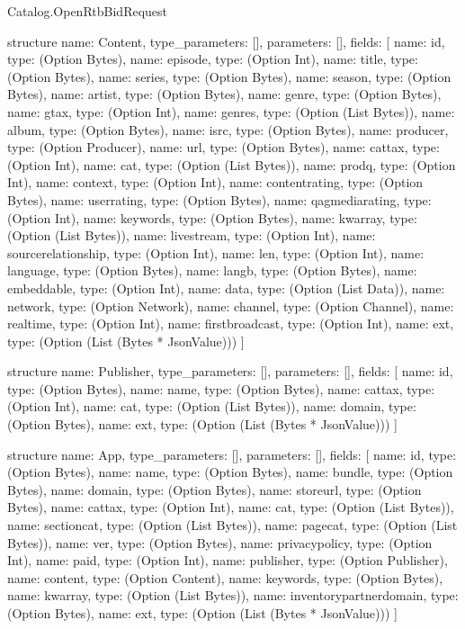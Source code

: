 \begin{lexlean}{Catalog.OpenRtbBidRequest}
\begin{semanticmodule}
structure{
  name: Content,
  type_parameters: [],
  parameters: [],
  fields: [
    {name: id, type: (Option Bytes)},
    {name: episode, type: (Option Int)},
    {name: title, type: (Option Bytes)},
    {name: series, type: (Option Bytes)},
    {name: season, type: (Option Bytes)},
    {name: artist, type: (Option Bytes)},
    {name: genre, type: (Option Bytes)},
    {name: gtax, type: (Option Int)},
    {name: genres, type: (Option (List Bytes))},
    {name: album, type: (Option Bytes)},
    {name: isrc, type: (Option Bytes)},
    {name: producer, type: (Option Producer)},
    {name: url, type: (Option Bytes)},
    {name: cattax, type: (Option Int)},
    {name: cat, type: (Option (List Bytes))},
    {name: prodq, type: (Option Int)},
    {name: context, type: (Option Int)},
    {name: contentrating, type: (Option Bytes)},
    {name: userrating, type: (Option Bytes)},
    {name: qagmediarating, type: (Option Int)},
    {name: keywords, type: (Option Bytes)},
    {name: kwarray, type: (Option (List Bytes))},
    {name: livestream, type: (Option Int)},
    {name: sourcerelationship, type: (Option Int)},
    {name: len, type: (Option Int)},
    {name: language, type: (Option Bytes)},
    {name: langb, type: (Option Bytes)},
    {name: embeddable, type: (Option Int)},
    {name: data, type: (Option (List Data))},
    {name: network, type: (Option Network)},
    {name: channel, type: (Option Channel)},
    {name: realtime, type: (Option Int)},
    {name: firstbroadcast, type: (Option Int)},
    {name: ext, type: (Option (List (Bytes * JsonValue)))}
  ]
}

structure{
  name: Publisher,
  type_parameters: [],
  parameters: [],
  fields: [
    {name: id, type: (Option Bytes)},
    {name: name, type: (Option Bytes)},
    {name: cattax, type: (Option Int)},
    {name: cat, type: (Option (List Bytes))},
    {name: domain, type: (Option Bytes)},
    {name: ext, type: (Option (List (Bytes * JsonValue)))}
  ]
}

structure{
  name: App,
  type_parameters: [],
  parameters: [],
  fields: [
    {name: id, type: (Option Bytes)},
    {name: name, type: (Option Bytes)},
    {name: bundle, type: (Option Bytes)},
    {name: domain, type: (Option Bytes)},
    {name: storeurl, type: (Option Bytes)},
    {name: cattax, type: (Option Int)},
    {name: cat, type: (Option (List Bytes))},
    {name: sectioncat, type: (Option (List Bytes))},
    {name: pagecat, type: (Option (List Bytes))},
    {name: ver, type: (Option Bytes)},
    {name: privacypolicy, type: (Option Int)},
    {name: paid, type: (Option Int)},
    {name: publisher, type: (Option Publisher)},
    {name: content, type: (Option Content)},
    {name: keywords, type: (Option Bytes)},
    {name: kwarray, type: (Option (List Bytes))},
    {name: inventorypartnerdomain, type: (Option Bytes)},
    {name: ext, type: (Option (List (Bytes * JsonValue)))}
  ]
}


\end{semanticmodule}
\end{lexlean}
